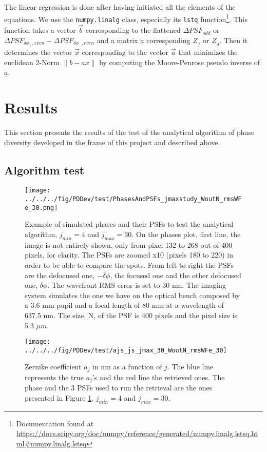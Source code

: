 The linear regression is done after having initiated all the elements of the equations. We use the \verb!numpy.linalg! class, especially its \verb!lstq! function\footnote{Documentation found at \url{https://docs.scipy.org/doc/numpy/reference/generated/numpy.linalg.lstsq.html\#numpy.linalg.lstsq}}. This function takes a vector $\vec{b}$ corresponding to the flattened $\Delta PSF_{odd}$ or $\Delta PSF_{\delta\phi_+, even}-\Delta PSF_{\delta\phi_-, even}$ and a matrix  $\underline{a}$ corresponding $\underline{Z}_f$ or $\underline{Z}_d$. Then it determines the vector $\vec{x}$ corresponding to the vector $\vec{a}$ that minimizes the euclidean 2-Norm $\lVert b-ax \rVert$ by computing the Moore-Penrose pseudo inverse of $\underline{a}$.

\section{Results}
\label{sec:ourPDresult}

This section presents the results of the test of the analytical algorithm of phase diversity developed in the frame of this project and described above.

\subsection{Algorithm test}

\begin{figure}
\begin{center}
\texttt{[image: ../../../fig/PDDev/test/PhasesAndPSFs\_jmaxstudy\_WoutN\_rmsWFe\_30.png]}
\decoRule
\caption{Example of simulated phases and their PSFs to test the analytical algorithm, $j_{min}=4$ and $j_{max}=30$. On the phases plot, first line, the image is not entirely shown, only from pixel 132 to 268 out of 400 pixels, for clarity. The PSFs are zoomed x10 (pixels 180 to 220) in order to be able to compare the spots. From left to right the PSFs are the defocused one, $-\delta\phi$, the focused one and the other defocused one, $\delta\phi$. The wavefront RMS error is set to 30 nm. The imaging system simulates the one we have on the optical bench composed by a 3.6 mm pupil and a focal length of 80 mm at a wavelength of 637.5 nm. The size, N, of the PSF is 400 pixels and the pixel size is 5.3 $\mu m$.}
\label{fig:simPhasesAndPSFs}
\end{center}
\end{figure}
 

\begin{figure}
\begin{center}
\texttt{[image: ../../../fig/PDDev/test/ajs\_js\_jmax\_30\_WoutN\_rmsWFe\_30]}
\decoRule
\caption{Zernike coefficient $a_j$ in nm as a function of $j$. The blue line represents the true $a_j$'s and the red line the retrieved ones. The phase and the 3 PSFs used to run the retrieval are the ones presented in Figure \ref{fig:simPhasesAndPSFs}. $j_{min}=4$ and $j_{max}=30$.}
\label{fig:ajs_js_jmax_30_WoutN_rmsWFe_30}
\end{center}
\end{figure} 

